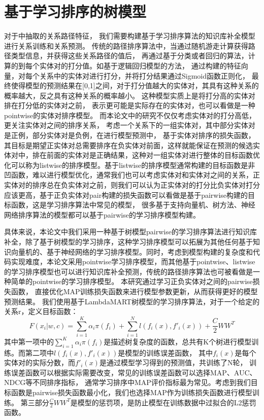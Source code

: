 \section{基于学习排序的树模型}
对于\label{sec:relational}中抽取的关系路径特征，
我们需要构建基于学习排序算法的知识库补全模型进行关系训练和关系预测。
传统的路径排序算法中，当通过随机游走计算获得路径类型信息，并获得这些关系路径的值后，
再通过基于分类或者回归的算法，计算的到每个实体对的打分值。如基于逻辑回归模型的方法，
通过构建的特征向量，对每个关系中的实体对进行打分，并将打分结果通过Sigmoid函数正则化，
最终使得模型的预测结果在[0,1]之间，对于打分值越大的实体对，其具有这种关系的概率越大，反之具有这种关系的概率越小。
这种模型实质上是将打分高的实体对排在打分低的实体对之前，
表示更可能是实际存在的实体对，也可以看做是一种pointwise的实体对排序模型。
而本论文中的研究不仅仅考虑实体对的打分高低，更关注实体对之间的排序关系，
考虑一个关系下的一组实体对，其中部分实体对是正例，部分实体对是负例，在进行模型预测中，
基于实体对排序的损失函数，其目标是期望正实体对总需要排序在负实体对前面，这样就能保证在预测的候选实体对中，排在前面的实体对是正确结果，这种对一组实体对进行整体的目标函数优化可以称为listwise的排序模型。基于listwise的排序模型通常构建的目标函数是非凹函数，难以进行模型优化，通常我们也可以考虑实体对和实体对之间的关系，正实体对的排序总在负实体对之前，则我们可以认为正实体对的打分比负实体对打分应该更高，基于正负实体对pair构建的损失函数可以看做是基于pairwise构建的目标函数，这是学习排序算法中常见的模型，
很多基于支持向量机、树方法、神经网络排序算法的模型都可以基于pairwise的学习排序模型构建。

具体来说，本论文中我们采用一种基于树模型pairwise的学习排序算法进行知识库补全，除了基于树模型的学习排序，这种学习排序模型可以拓展为其他任何基于知识向量机的、基于神经网络的学习排序模型。同时，考虑到模型构建的复杂度和代码实现难度，本论文采用pointwise学习排序模型，而其他基于pointwise、listwise的学习排序模型也可以进行知识库补全预测，传统的路径排序算法也可被看做是一种简单的pointwise的学习排序模型。
本研究通过学习正负实体对之间的pairwise损失函数，
直接优化MAP训练损失函数来进行模型参数更新，从而获得更好的模型预测结果。
我们使用基于LambdaMART树模型的学习排序算法，对于一个给定的关系r，定义目标函数：
$$F(x_i|w,c)=\sum_{i=1}^K\alpha_i\pi(f_i)+\sum_{i=1}^Nl(f_i(x),f'_i(x))+\frac{C}{2}WW^T$$
其中第一项中的$\sum_{i=1}^K\alpha_i\pi(f_i)$是描述树复杂度的函数，总共有K个树进行模型训练。而第二项中$l(f_i(x),f'_i(x))$是模型的训练误差函数，
其中$f_i (x)$是每个实体对的实际分数，而$f'_i(x)$是通过模型学习得到的预测值，共训练了N轮，
训练误差函数可以根据实际需要改变，常见的训练误差函数可以选择MAP、AUC、NDCG等不同排序指标，
通常学习排序中MAP评价指标最为常见。考虑到我们目标函数是pairwise损失函数最小化，我们也选择MAP作为训练损失函数进行模型训练。
第三部分$\frac{C}{2}WW^T$是模型的惩罚项，是防止模型在训练数据中过拟合的L2惩罚函数。

